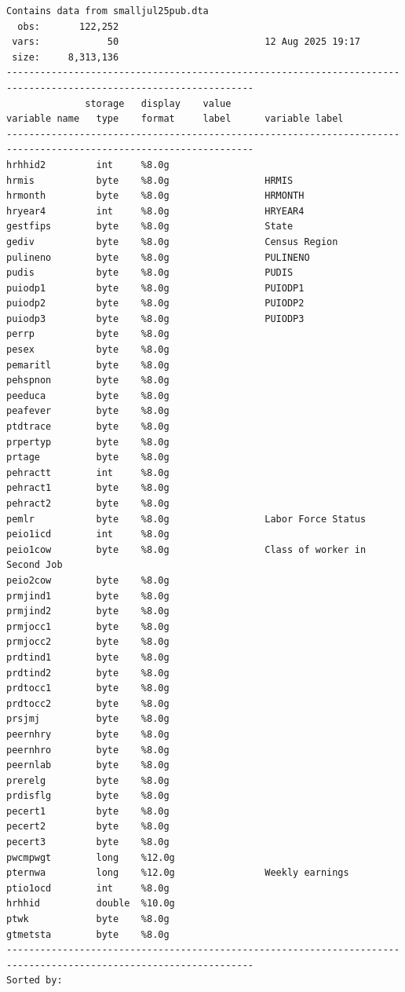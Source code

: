 \documentclass[
]{book}
\begin{document}
\begin{verbatim}
Contains data from smalljul25pub.dta
  obs:       122,252                          
 vars:            50                          12 Aug 2025 19:17
 size:     8,313,136                          
------------------------------------------------------------------------------------------------------------------
              storage   display    value
variable name   type    format     label      variable label
------------------------------------------------------------------------------------------------------------------
hrhhid2         int     %8.0g                 
hrmis           byte    %8.0g                 HRMIS
hrmonth         byte    %8.0g                 HRMONTH
hryear4         int     %8.0g                 HRYEAR4
gestfips        byte    %8.0g                 State
gediv           byte    %8.0g                 Census Region
pulineno        byte    %8.0g                 PULINENO
pudis           byte    %8.0g                 PUDIS
puiodp1         byte    %8.0g                 PUIODP1
puiodp2         byte    %8.0g                 PUIODP2
puiodp3         byte    %8.0g                 PUIODP3
perrp           byte    %8.0g                 
pesex           byte    %8.0g                 
pemaritl        byte    %8.0g                 
pehspnon        byte    %8.0g                 
peeduca         byte    %8.0g                 
peafever        byte    %8.0g                 
ptdtrace        byte    %8.0g                 
prpertyp        byte    %8.0g                 
prtage          byte    %8.0g                 
pehractt        int     %8.0g                 
pehract1        byte    %8.0g                 
pehract2        byte    %8.0g                 
pemlr           byte    %8.0g                 Labor Force Status
peio1icd        int     %8.0g                 
peio1cow        byte    %8.0g                 Class of worker in Second Job
peio2cow        byte    %8.0g                 
prmjind1        byte    %8.0g                 
prmjind2        byte    %8.0g                 
prmjocc1        byte    %8.0g                 
prmjocc2        byte    %8.0g                 
prdtind1        byte    %8.0g                 
prdtind2        byte    %8.0g                 
prdtocc1        byte    %8.0g                 
prdtocc2        byte    %8.0g                 
prsjmj          byte    %8.0g                 
peernhry        byte    %8.0g                 
peernhro        byte    %8.0g                 
peernlab        byte    %8.0g                 
prerelg         byte    %8.0g                 
prdisflg        byte    %8.0g                 
pecert1         byte    %8.0g                 
pecert2         byte    %8.0g                 
pecert3         byte    %8.0g                 
pwcmpwgt        long    %12.0g                
pternwa         long    %12.0g                Weekly earnings
ptio1ocd        int     %8.0g                 
hrhhid          double  %10.0g                
ptwk            byte    %8.0g                 
gtmetsta        byte    %8.0g                 
------------------------------------------------------------------------------------------------------------------
Sorted by: 
\end{verbatim}
\end{document}
